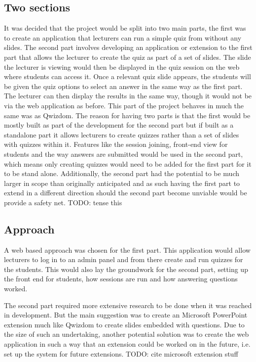 \subsection{Two sections}
It was decided that the project would be split into two main parts, the first was to create an application that lecturers can run a simple quiz from without any slides. The second part involves developing an application or extension to the first part that allows the lecturer to create the quiz as part of a set of slides. The slide the lecturer is viewing would then be displayed in the quiz session on the web where students can access it. Once a relevant quiz slide appears, the students will be given the quiz options to select an answer in the same way as the first part. The lecturer can then display the results in the same way, though it would not be via the web application as before. This part of the project behaves in much the same was as Qwizdom.
The reason for having two parts is that the first would be mostly built as part of the development for the second part but if built as a standalone part it allows lecturers to create quizzes rather than a set of slides with quizzes within it. Features like the session joining, front-end view for students and the way answers are submitted would be used in the second part, which means only creating quizzes would need to be added for the first part for it to be stand alone. Additionally, the second part had the potential to be much larger in scope than originally anticipated and as such having the first part to extend in a different direction should the second part become unviable would be provide a safety net.
TODO: tense this
\subsection{Approach}
A web based approach was chosen for the first part. This application would allow lecturers to log in to an admin panel and from there create and run quizzes for the students. This would also lay the groundwork for the second part, setting up the front end for students, how sessions are run and how answering questions worked. 

The second part required more extensive research to be done when it was reached in development. But the main suggestion was to create an Microsoft PowerPoint extension much like Qwizdom to create slides embedded with questions. Due to the size of such an undertaking, another potential solution was to create the web application in such a way that an extension could be worked on in the future, i.e. set up the system for future extensions. TODO: cite microsoft extension stuff
